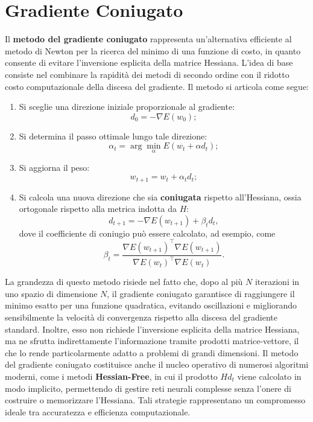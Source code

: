 \section{Gradiente Coniugato}

Il \textbf{metodo del gradiente coniugato} rappresenta un'alternativa efficiente al metodo di Newton per la ricerca del minimo di una funzione di costo, in quanto consente di evitare l'inversione esplicita della matrice Hessiana. L'idea di base consiste nel combinare la rapidità dei metodi di secondo ordine con il ridotto costo computazionale della discesa del gradiente. Il metodo si articola come segue:
\begin{enumerate}
    \item Si sceglie una direzione iniziale proporzionale al gradiente: 
    \[
    d_0 = -\nabla E(w_0);
    \]
    \item Si determina il passo ottimale lungo tale direzione:
    \[
    \alpha_t = \arg\min_{\alpha} E(w_t + \alpha d_t);
    \]
    \item Si aggiorna il peso:
    \[
    w_{t+1} = w_t + \alpha_t d_t;
    \]
    \item Si calcola una nuova direzione che sia \textbf{coniugata} rispetto all'Hessiana, ossia ortogonale rispetto alla metrica indotta da \( H \):
    \[
    d_{t+1} = -\nabla E(w_{t+1}) + \beta_t d_t,
    \]
    dove il coefficiente di coniugio può essere calcolato, ad esempio, come
    \[
    \beta_t = \frac{\nabla E(w_{t+1})^\top \nabla E(w_{t+1})}{\nabla E(w_t)^\top \nabla E(w_t)}.
    \]
\end{enumerate}

La grandezza di questo metodo risiede nel fatto che, dopo al più \( N \) iterazioni in uno spazio di dimensione \( N \), il gradiente coniugato garantisce di raggiungere il minimo esatto per una funzione quadratica, evitando oscillazioni e migliorando sensibilmente la velocità di convergenza rispetto alla discesa del gradiente standard. Inoltre, esso non richiede l'inversione esplicita della matrice Hessiana, ma ne sfrutta indirettamente l'informazione tramite prodotti matrice-vettore, il che lo rende particolarmente adatto a problemi di grandi dimensioni. Il metodo del gradiente coniugato costituisce anche il nucleo operativo di numerosi algoritmi moderni, come i metodi \textbf{Hessian-Free}, in cui il prodotto \( H d_t \) viene calcolato in modo implicito, permettendo di gestire reti neurali complesse senza l’onere di costruire o memorizzare l’Hessiana. Tali strategie rappresentano un compromesso ideale tra accuratezza e efficienza computazionale.

